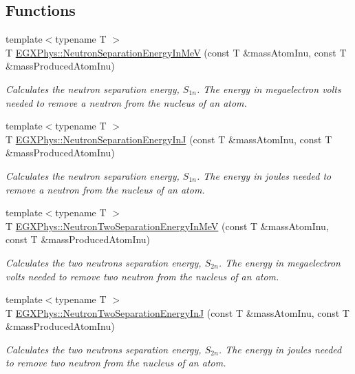 \subsection*{Functions}
\begin{DoxyCompactItemize}
\item 
{\footnotesize template$<$typename T $>$ }\\T \hyperlink{group___nuclear_separation_energy_ga66133edb5809c81dd9fd60e09ebbef79}{E\+G\+X\+Phys\+::\+Neutron\+Separation\+Energy\+In\+MeV} (const T \&mass\+Atom\+Inu, const T \&mass\+Produced\+Atom\+Inu)
\begin{DoxyCompactList}\small\item\em Calculates the neutron separation energy, $S_{1n}$. The energy in megaelectron volts needed to remove a neutron from the nucleus of an atom. \end{DoxyCompactList}\item 
{\footnotesize template$<$typename T $>$ }\\T \hyperlink{group___nuclear_separation_energy_ga14a4bb972ae000ef4ff35f2734ff22d0}{E\+G\+X\+Phys\+::\+Neutron\+Separation\+Energy\+InJ} (const T \&mass\+Atom\+Inu, const T \&mass\+Produced\+Atom\+Inu)
\begin{DoxyCompactList}\small\item\em Calculates the neutron separation energy, $S_{1n}$. The energy in joules needed to remove a neutron from the nucleus of an atom. \end{DoxyCompactList}\item 
{\footnotesize template$<$typename T $>$ }\\T \hyperlink{group___nuclear_separation_energy_ga09985fc876eb632695bfbc1f2f325401}{E\+G\+X\+Phys\+::\+Neutron\+Two\+Separation\+Energy\+In\+MeV} (const T \&mass\+Atom\+Inu, const T \&mass\+Produced\+Atom\+Inu)
\begin{DoxyCompactList}\small\item\em Calculates the two neutrons separation energy, $S_{2n}$. The energy in megaelectron volts needed to remove two neutron from the nucleus of an atom. \end{DoxyCompactList}\item 
{\footnotesize template$<$typename T $>$ }\\T \hyperlink{group___nuclear_separation_energy_ga293ac9428420a0adf4235048dbe529b4}{E\+G\+X\+Phys\+::\+Neutron\+Two\+Separation\+Energy\+InJ} (const T \&mass\+Atom\+Inu, const T \&mass\+Produced\+Atom\+Inu)
\begin{DoxyCompactList}\small\item\em Calculates the two neutrons separation energy, $S_{2n}$. The energy in joules needed to remove two neutron from the nucleus of an atom. \end{DoxyCompactList}\item 

\end{DoxyCompactItemize}
